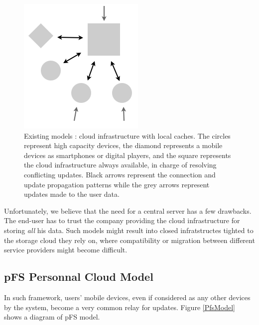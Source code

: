 \begin{figure}[ht]
\begin{center}
  \includegraphics [scale=0.4] {img/other_model}
  \caption{\label{OthModel}
    {\small Existing models : cloud infrastructure with local
      caches. The circles represent high capacity devices, the diamond
      represents a mobile devices as smartphones or digital players,
      and the square represents the cloud infrastructure always
      available, in charge of resolving conflicting updates. Black
      arrows represent the connection and update propagation patterns
      while the grey arrows represent updates made to the user data.}}
\end{center}
\end{figure}

Unfortunately, we believe that the need for a central server has a few
drawbacks. The end-user has to trust the company providing the cloud
infrastructure for storing \emph{all} his data. Such models might
result into closed infratstructes tighted to the storage cloud
they rely on, where compatibility or migration between different
service providers might become difficult.

\subsection {pFS Personnal Cloud Model}

In such
framework, users' mobile devices, even if considered as any other
devices by the system, become a very common relay for updates. Figure
\ref{PfsModel} shows a diagram of pFS model.

